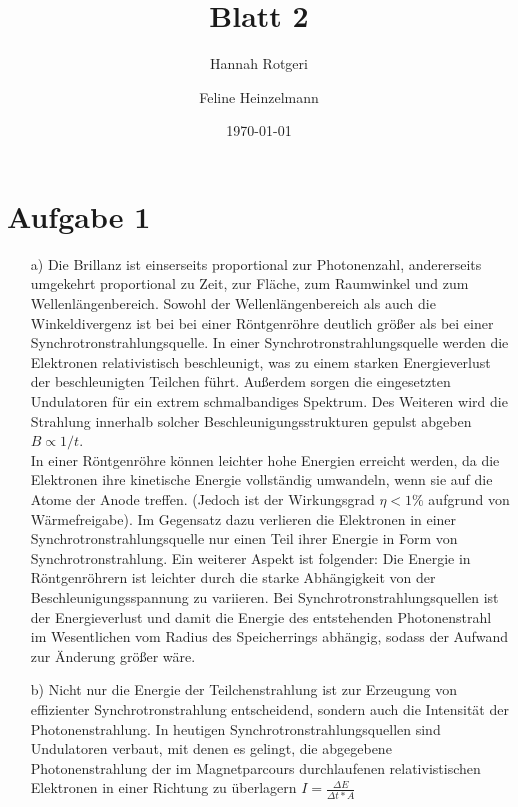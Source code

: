 \documentclass[11pt,a4paper]{article}
\title{Blatt 2}
\date{\today}
\author{Hannah Rotgeri \and Feline Heinzelmann}
\begin{document}
    \maketitle

    \section*{Aufgabe 1}
    	\begin{enumerate}
		\item[a)] Die Brillanz ist einserseits proportional zur Photonenzahl, andererseits umgekehrt proportional zu Zeit, zur Fläche, zum Raumwinkel und zum Wellenlängenbereich. Sowohl der Wellenlängenbereich als auch die Winkeldivergenz ist bei bei einer Röntgenröhre deutlich größer als bei einer Synchrotronstrahlungsquelle. In einer Synchrotronstrahlungsquelle werden die Elektronen relativistisch beschleunigt, was zu einem starken Energieverlust der beschleunigten Teilchen führt. Außerdem sorgen die eingesetzten Undulatoren für ein extrem schmalbandiges Spektrum. Des Weiteren wird die Strahlung innerhalb solcher Beschleunigungsstrukturen gepulst abgeben \( B \propto 1/t \). \\
		
		In einer Röntgenröhre können leichter hohe Energien erreicht werden, da die Elektronen ihre kinetische Energie vollständig umwandeln, wenn sie auf die Atome der Anode treffen. (Jedoch ist der Wirkungsgrad \( \eta < 1\% \) aufgrund von Wärmefreigabe). Im Gegensatz dazu verlieren die Elektronen in einer Synchrotronstrahlungsquelle nur einen Teil ihrer Energie in Form von Synchrotronstrahlung. Ein weiterer Aspekt ist folgender: Die Energie in Röntgenröhrern ist leichter durch die starke Abhängigkeit von der Beschleunigungsspannung zu variieren. Bei Synchrotronstrahlungsquellen ist der Energieverlust und damit die Energie des entstehenden Photonenstrahl im Wesentlichen vom Radius des Speicherrings abhängig, sodass der Aufwand zur Änderung größer wäre.
		\item[b)] Nicht nur die Energie der Teilchenstrahlung ist zur Erzeugung von effizienter Synchrotronstrahlung entscheidend, sondern auch die Intensität der Photonenstrahlung. In heutigen Synchrotronstrahlungsquellen sind Undulatoren verbaut, mit denen es gelingt, die abgegebene Photonenstrahlung der im Magnetparcours durchlaufenen relativistischen Elektronen in einer Richtung zu überlagern \(I = \frac{\Delta E}{\Delta t * A}\)
	\end{enumerate}
	
\end{document}
